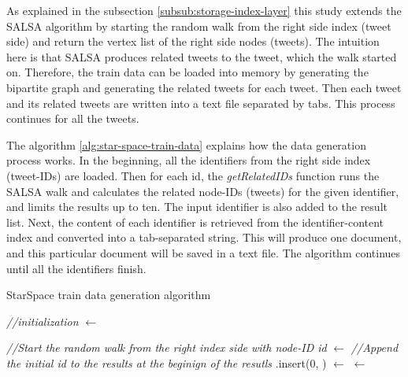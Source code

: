 As explained in the subsection \ref{subsub:storage-index-layer} this study extends the SALSA algorithm by starting the random walk from the right side index (tweet side) and return the vertex list of the right side nodes (tweets). The intuition here is that SALSA produces related tweets to the tweet, which the walk started on. Therefore, the train data can be loaded into memory by generating the bipartite graph and generating the related tweets for each tweet. Then each tweet and its related tweets are written into a text file separated by tabs. This process continues for all the tweets.


The algorithm \ref{alg:star-space-train-data} explains how the data generation process works. In the beginning, all the identifiers from the right side index (tweet-IDs) are loaded. Then for each id, the \emph{getRelatedIDs} function runs the SALSA walk and calculates the related node-IDs (tweets) for the given identifier, and limits the results up to ten. The input identifier is also added to the result list. Next, the content of each identifier is retrieved from the identifier-content index and converted into a tab-separated string. This will produce one document, and this particular document will be saved in a text file. The algorithm continues until all the identifiers finish.


\begin{algorithm}[H]
    \caption{StarSpace train data generation algorithm}
    \label{alg:star-space-train-data}




    \SetAlgoLined

    \BlankLine\emph{//initialization}\BlankLine
    \allIDs $\leftarrow$ \getAllRightIndexKeys{}\;

    \BlankLine

    {
		\emph{//Start the random walk from the right index side with node-ID id}\;
		\listRecommendations $\leftarrow$ \getRelatedIDs{\id}\;
		\BlankLine
		\emph{//Append the initial id to the results at the beginign of the resutls}\;
		\listRecommendations.insert(0, \id)\;
		\BlankLine
		\listContent $\leftarrow$ \getContentOf{\listRecommendations}\;
		\document $\leftarrow$ \;
		\;
    }

    \BlankLine
\end{algorithm}


